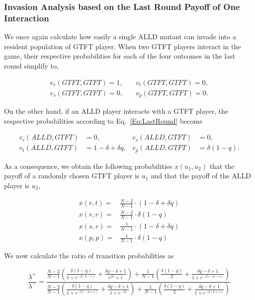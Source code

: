 \documentclass[11pt]{article}
\theoremstyle{plainCl1}
\theoremstyle{plainCl2}
\begin{document}
\subsubsection*{Invasion Analysis based on the Last Round Payoff of One Interaction}

We once again calculate how easily a single ALLD mutant can invade into a
resident population of GTFT player. When two GTFT players interact in the game,
their respective probabilities for each of the four outcomes in the last round
simplify to,

\begin{align*}
    v_{r}(GTFT,GTFT) = 1, & \quad v_{t}(GTFT,GTFT) = 0, \\
    v_{s}(GTFT,GTFT) = 0, & \quad v_{p}(GTFT,GTFT) = 0.
\end{align*}

On the other hand, if an ALLD player interacts with a GTFT player, the
respective probabilities according to Eq.~\ref{Eq:LastRound} become

\begin{align*}
    v_{r}(ALLD,GTFT) & = 0, &  v_{s}(ALLD,GTFT) & = 0, \\
    v_{t} (ALLD, GTFT ) & = 1 - \delta + \delta q, &  v_{p} (ALLD, GTFT) & = \delta(1 - q).
\end{align*}

As a consequence, we obtain the following probabilities \(x(u_1, u_2)\) that the
payoff of a randomly chosen GTFT player is \(u_1\) and that the payoff of the
ALLD player is \(u_2\),

\begin{align*}
  x(r, t) = & \frac{N - 2}{N - 1} \cdot (1 - \delta + \delta q)\\
  x(r, r) = & \frac{N - 2}{N - 1} \cdot \delta (1 - q) \\
  x(s, r) = & \frac{1}{N - 1} \cdot (1 - \delta + \delta q) \\
  x(p, p) = & \frac{1}{N - 1} \cdot \delta (1 - q)
\end{align*}

We now calculate the ratio of transition probabilities as

\begin{equation*}
\frac{\lambda^{+}}{\lambda^{-}} = \frac{ \frac{N - 2}{N - 1}  \left( \frac{ \delta  \left(1 - q \right)}{1
+ e^{-  \beta  \left(b - c \right)}} +  \frac{ \delta q -  \delta + 1}{e^{ \beta
c} + 1} \right)  +  \frac{1}{N-1}  \left(\frac{ \delta  \left(1 - q \right)}{2} +
 \frac{ \delta q -  \delta + 1}{1 + e^{-  \beta  \left(- b - c \right)}}\right)}
 { \frac{N - 2}{N - 1}  \left( \frac{ \delta  \left(1 - q \right)}{1 +
e^{-  \beta  \left(- b + c \right)}} +  \frac{ \delta q -  \delta + 1}{1 + e^{-
 \beta c}} \right) +  \frac{1}{N -1} \left(\frac{ \delta  \left(1 - q \right)}{2} +
 \frac{ \delta q -  \delta + 1}{1 + e^{-  \beta  \left(b + c \right)}}\right)}
\end{equation*}
\end{document}
